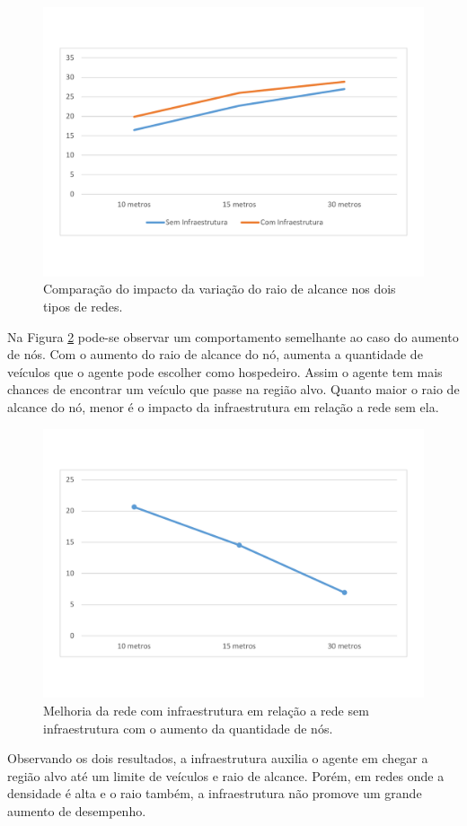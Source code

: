 \begin{figure}[htbp]
	\centering
	\includegraphics[scale=0.34]{resultados/graficos/comparacaoVariacaoRaioAlcance.pdf}
	\caption{Comparação do impacto da variação do raio de alcance nos dois tipos de redes.}
	\label{fig:comparacaoVariacaoRaioAlcance}
\end{figure}

Na Figura \ref{fig:comparacaoMelhoriaComVariacaoRaioAlcance} pode-se observar um comportamento semelhante ao caso do aumento de nós. Com o aumento do raio de alcance do nó, aumenta a quantidade de veículos que o agente pode escolher como hospedeiro. Assim o agente tem mais chances de encontrar um veículo que passe na região alvo. Quanto maior o raio de alcance do nó, menor é o impacto da infraestrutura em relação a rede sem ela.

\begin{figure}[htbp]
	\centering
	\includegraphics[scale=0.34]{resultados/graficos/comparacaoMelhoriaComVariacaoRaioAlcance.pdf}
	\caption{Melhoria da rede com infraestrutura em relação a rede sem infraestrutura com o aumento da quantidade de nós.}
	\label{fig:comparacaoMelhoriaComVariacaoRaioAlcance}
\end{figure}

Observando os dois resultados, a infraestrutura auxilia o agente em chegar a região alvo até um limite de veículos e raio de alcance. Porém, em redes onde a densidade é alta e o raio também, a infraestrutura não promove um grande aumento de desempenho.
